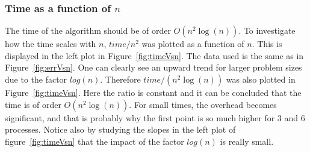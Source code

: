 \subsubsection{Time as a function of $n$}
The time of the algorithm should be of order $O(n^2 \log(n))$. To investigate how the time scales with $n$, $time/n^2$ was plotted as a function of $n$. This is displayed in the left plot in Figure~\ref{fig:timeVsn}. The data used is the same as in Figure~\ref{fig:errVsn}. One can clearly see an upward trend for larger problem sizes due to the factor $log(n)$. Therefore $time/(n^2 \log(n))$ was also plotted in Figure~\ref{fig:timeVsn}. Here the ratio is constant and it can be concluded that the time is of order $O(n^2 \log(n))$. For small times, the overhead becomes significant, and that is probably why the first point is so much higher for 3 and 6 processes. Notice also by studying the slopes in the left plot of figure~\ref{fig:timeVsn} that the impact of the factor $log(n)$ is really small.  
